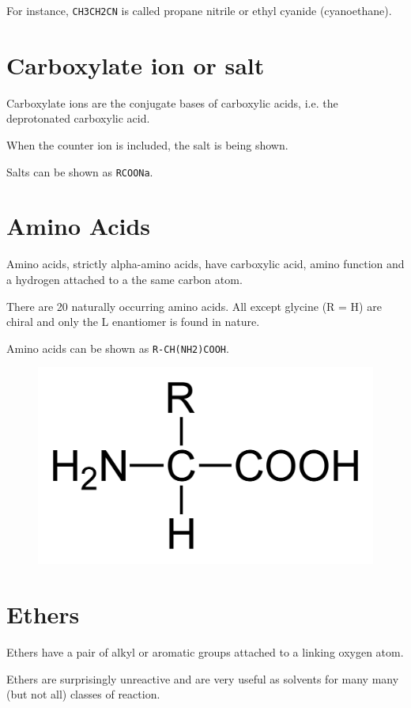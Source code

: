 \documentclass[oneside]{book} %
\theoremstyle{plain}
\begin{document}
For instance, \texttt{CH3CH2CN} is called propane nitrile or ethyl cyanide
(cyanoethane).

\section{Carboxylate ion or salt}
Carboxylate ions are the conjugate bases of carboxylic acids, i.e. the
deprotonated carboxylic acid.

When the counter ion is included, the salt is being shown.

Salts can be shown as \texttt{RCOONa}.

\section{Amino Acids}
Amino acids, strictly alpha-amino acids, have carboxylic acid, amino function
and a hydrogen attached to a the same carbon atom.

There are 20 naturally occurring amino acids. All except glycine (R = H) are
chiral and only the L enantiomer is found in nature.

Amino acids can be shown as \texttt{R-CH(NH2)COOH}.

\begin{figure}[ht]
\includegraphics[scale=0.125]{alpha-amino-acid-flat.png}
\centering
\end{figure}

\section{Ethers}
Ethers have a pair of alkyl or aromatic groups attached to a linking oxygen
atom.

Ethers are surprisingly unreactive and are very useful as solvents for many many
(but not all) classes of reaction.
\end{document}
